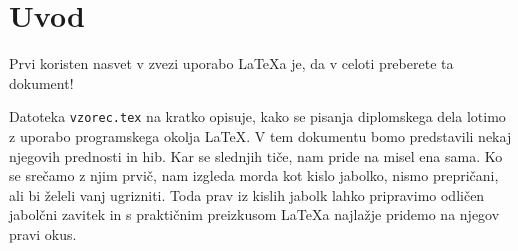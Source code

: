 \documentclass[a4paper, 12pt]{report}
\author{Janez Novak}
\date{oktober 2020}
\begin{document}
\newcommand{\sn}[1]{"`#1"'}     %


\thispagestyle{empty}%

\setcounter{page}{2}


\setlength{\parskip}{0em}
\tableofcontents
\setlength{\parskip}{1em}


\clearpage{}

\chapter{Uvod}

Prvi koristen nasvet v zvezi uporabo \LaTeX{a} je, da v celoti preberete ta dokument!

Datoteka {\tt vzorec.tex} na kratko opisuje, kako se pisanja diplomskega dela lotimo z uporabo programskega okolja \LaTeX.
V tem dokumentu bomo predstavili nekaj njegovih prednosti in hib. 
Kar se slednjih tiče, nam pride na misel ena sama. 
Ko se srečamo z njim prvič, nam izgleda morda kot kislo jabolko, nismo prepričani, ali bi želeli vanj ugrizniti. 
Toda prav iz kislih jabolk lahko pripravimo odličen jabolčni zavitek in s praktičnim preizkusom \LaTeX a najlažje pridemo na njegov pravi okus.
\end{document}
